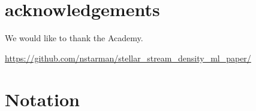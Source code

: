 \documentclass[twocolumn]{aastex631}
\begin{document}
            




\section{acknowledgements}

    We would like to thank the Academy.

    \url{https://github.com/nstarman/stellar_stream_density_ml_paper/}




\appendix

\section{Notation} \label{app:notation}
\end{document}

